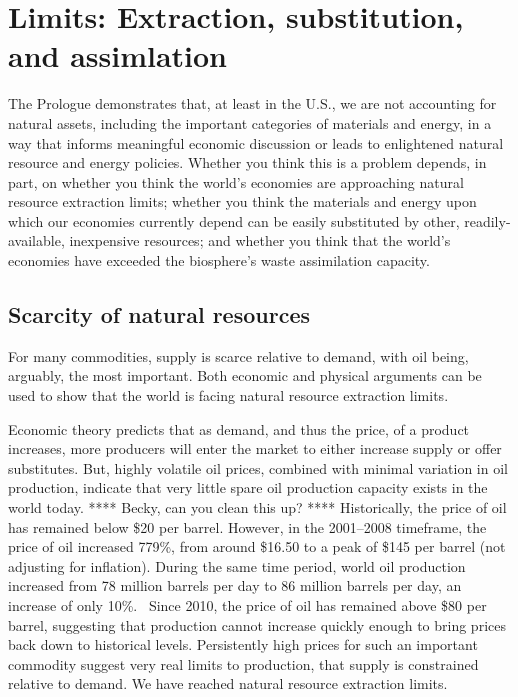 \section{Limits: Extraction, substitution, and assimlation}
\label{sec:limits}

The Prologue demonstrates that, at least in the U.S., 
we are not accounting for natural assets, 
including the important categories of materials and energy,
in a way that informs meaningful economic discussion or
leads to enlightened natural resource and energy policies.
Whether you think this is a problem depends, in part, on 
whether you think the world's economies are approaching 
	natural resource extraction limits;
whether you think the materials and energy upon which our economies currently depend
	can be easily substituted by other, readily-available, inexpensive resources; and
whether you think that the world's economies have exceeded 
	the biosphere's waste assimilation capacity.


\subsection{Scarcity of natural resources}
\label{sub:scarcity_of_natural_resources}

For many commodities, supply is scarce relative to demand, 
with oil being, arguably, the most important. 
Both economic and physical arguments can be used to show that the world is facing
natural resource extraction limits.

Economic theory predicts that as demand, and thus the price, of a product increases,
more producers will enter the market to either
increase supply or offer substitutes. 
But, highly volatile oil prices, combined with minimal variation in oil production,
indicate that very little 
spare oil production capacity exists in the world today. 
**** Becky, can you clean this up? ****
Historically, the price of oil has remained below \$20 per barrel.
However, in the 2001--2008 timeframe,
the price of oil increased 779\%,
from around \$16.50 to a peak of \$145 per barrel 
(not adjusting for inflation).
During the same time period,
world oil production increased from 
78 million barrels per day to 86 million barrels per day,
an increase of only 10\%.~\cite{EIA2014}
Since 2010, the price of oil has remained above \$80 per barrel,
suggesting that production cannot increase quickly enough to bring prices
back down to historical levels.
Persistently high prices for such an important commodity
suggest very real limits to production, 
that supply is constrained relative to demand. 
We have reached natural resource extraction limits.

